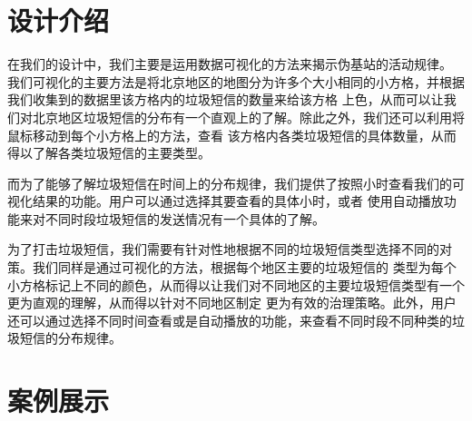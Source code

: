 \documentclass[12pt,a4paper]{article}
\begin{document}
\section{设计介绍}

在我们的设计中，我们主要是运用数据可视化的方法来揭示伪基站的活动规律。
我们可视化的主要方法是将北京地区的地图分为许多个大小相同的小方格，并根据我们收集到的数据里该方格内的垃圾短信的数量来给该方格
上色，从而可以让我们对北京地区垃圾短信的分布有一个直观上的了解。除此之外，我们还可以利用将鼠标移动到每个小方格上的方法，查看
该方格内各类垃圾短信的具体数量，从而得以了解各类垃圾短信的主要类型。

而为了能够了解垃圾短信在时间上的分布规律，我们提供了按照小时查看我们的可视化结果的功能。用户可以通过选择其要查看的具体小时，或者
使用自动播放功能来对不同时段垃圾短信的发送情况有一个具体的了解。

为了打击垃圾短信，我们需要有针对性地根据不同的垃圾短信类型选择不同的对策。我们同样是通过可视化的方法，根据每个地区主要的垃圾短信的
类型为每个小方格标记上不同的颜色，从而得以让我们对不同地区的主要垃圾短信类型有一个更为直观的理解，从而得以针对不同地区制定
更为有效的治理策略。此外，用户还可以通过选择不同时间查看或是自动播放的功能，来查看不同时段不同种类的垃圾短信的分布规律。

\section{案例展示}
\end{document}
